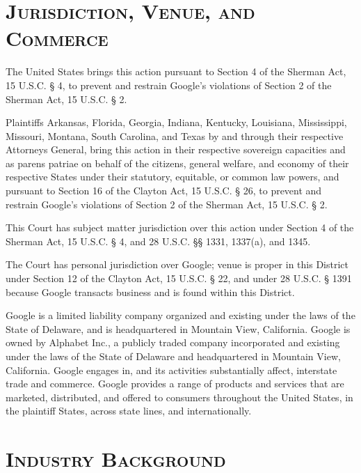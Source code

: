 \documentclass[11pt,b5paper,headings=small]{scrartcl}
\begin{document}

\section{\textsc{Jurisdiction, Venue, and Commerce}}
The United States brings this action pursuant to Section 4 of the Sherman Act,
15 U.S.C. § 4, to prevent and restrain Google’s violations of Section 2 of the Sherman Act,
15 U.S.C. § 2.


Plaintiffs Arkansas, Florida, Georgia, Indiana, Kentucky, Louisiana, Mississippi,
Missouri, Montana, South Carolina, and Texas by and through their respective Attorneys
General, bring this action in their respective sovereign capacities and as parens patriae on behalf
of the citizens, general welfare, and economy of their respective States under their statutory,
equitable, or common law powers, and pursuant to Section 16 of the Clayton Act,
15 U.S.C. § 26, to prevent and restrain Google’s violations of Section 2 of the Sherman Act,
15 U.S.C. § 2.


This Court has subject matter jurisdiction over this action under Section 4 of the
Sherman Act, 15 U.S.C. § 4, and 28 U.S.C. §§ 1331, 1337(a), and 1345.


The Court has personal jurisdiction over Google; venue is proper in this District
under Section 12 of the Clayton Act, 15 U.S.C. § 22, and under 28 U.S.C. § 1391 because
Google transacts business and is found within this District.


Google is a limited liability company organized and existing under the laws of the
State of Delaware, and is headquartered in Mountain View, California. Google is owned by
Alphabet Inc., a publicly traded company incorporated and existing under the laws of the State of
Delaware and headquartered in Mountain View, California. Google engages in, and its activities
substantially affect, interstate trade and commerce. Google provides a range of products and
services that are marketed, distributed, and offered to consumers throughout the United States, in
the plaintiff States, across state lines, and internationally.

\section{\textsc{Industry Background}}
\end{document}
